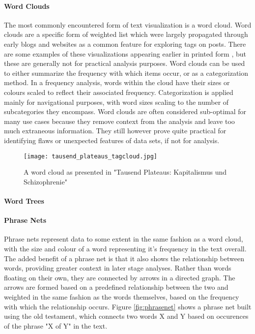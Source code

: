 \paragraph{Word Clouds}
The most commonly encountered form of text visualization is a word cloud. Word clouds are a specific form of weighted list which were largely propagated through early blogs and websites as a common feature for exploring tags on posts. There are some examples of these visualizations appearing earlier in printed form \cite{Deleuze1987}, but these are generally not for practical analysis purposes. Word clouds can be used to either summarize the frequency with which items occur, or as a categorization method. In a frequency analysis, words within the cloud have their sizes or colours scaled to reflect their associated frequency. Categorization is applied mainly for navigational purposes, with word sizes scaling to the number of subcategories they encompass. Word clouds are often considered sub-optimal for many use cases because they remove context from the analysis and leave too much extraneous information. They still however prove quite practical for identifying flaws or unexpected features of data sets, if not for analysis. 

\begin{figure}
	\centering
	\label{fig:wordcloud}
	\texttt{[image: tausend\_plateaus\_tagcloud.jpg]}
	\caption{A word cloud as presented in "Tausend Plateaus: Kapitalismus und Schizophrenie" \cite{Deleuze1987}}
\end{figure}

\paragraph{Word Trees}
\cite{Wattenburg2008}

\paragraph{Phrase Nets}
Phrase nets \cite{VanHam2009} represent data to some extent in the same fashion as a word cloud, with the size and colour of a word representing it's frequency in the text overall. The added benefit of a phrase net is that it also shows the relationship between words, providing greater context in later stage analyses. Rather than words floating on their own, they are connected by arrows in a directed graph. The arrows are formed based on a predefined relationship between the two and weighted in the same fashion as the words themselves, based on the frequency with which the relationship occurs. Figure \ref{fig:phrasenet} shows a phrase net built using the old testament, which connects two words X and Y based on occurences of the phrase "X of Y" in the text.

